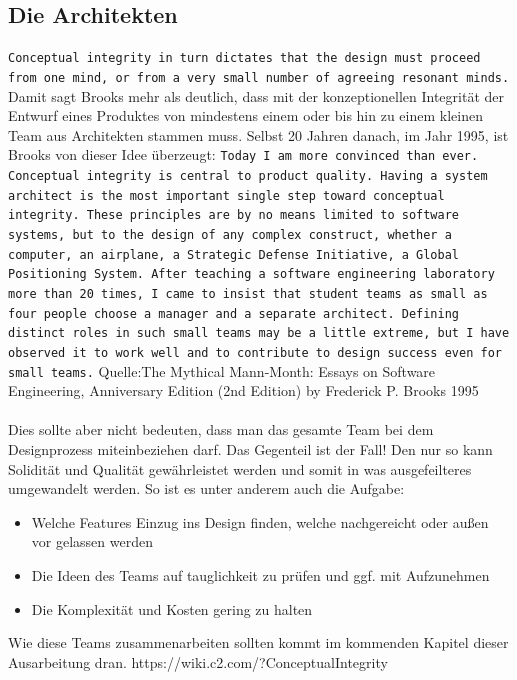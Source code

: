 \documentclass[a4paper, ngerman, 12pt, usenames, dvipsnames]{article}
\begin{document}
\subsection{Die Architekten}
\texttt{Conceptual integrity in turn dictates that the design must proceed from one mind, or from a very small number of agreeing resonant minds.}
Damit sagt Brooks mehr als deutlich, dass mit der konzeptionellen Integrität der Entwurf eines Produktes von mindestens einem oder bis hin zu einem kleinen Team aus Architekten stammen muss.
Selbst 20 Jahren danach, im Jahr 1995, ist Brooks von dieser Idee überzeugt: 
\texttt{Today I am more convinced than ever. Conceptual integrity is central to product quality. Having a system architect is the most important single step toward conceptual integrity.
These principles are by no means limited to software systems, but to the design of any complex construct, whether a computer, an airplane, a Strategic Defense Initiative, a Global Positioning System.
After teaching a software engineering laboratory more than 20 times, I came to insist that student teams as small as four people choose a manager and a separate architect. Defining distinct roles in such small teams may be a little extreme, but I have observed it to work well and to contribute to design success even for small teams.}
Quelle:The Mythical Mann-Month: Essays on Software Engineering, Anniversary Edition (2nd Edition) by Frederick P. Brooks 1995 \\
\\Dies sollte aber nicht bedeuten, dass man das gesamte Team bei dem Designprozess miteinbeziehen darf. Das Gegenteil ist der Fall! Den nur so kann Solidität und Qualität gewährleistet werden und somit in was ausgefeilteres umgewandelt werden.
So ist es unter anderem auch die Aufgabe:
\begin{itemize}
    \item Welche Features Einzug ins Design finden, welche nachgereicht oder außen vor gelassen werden
    \item Die Ideen des Teams auf tauglichkeit zu prüfen und ggf. mit Aufzunehmen
    \item Die Komplexität und Kosten gering zu halten
\end{itemize}
Wie diese Teams zusammenarbeiten sollten kommt im kommenden Kapitel dieser Ausarbeitung dran.
https://wiki.c2.com/?ConceptualIntegrity
\end{document}
